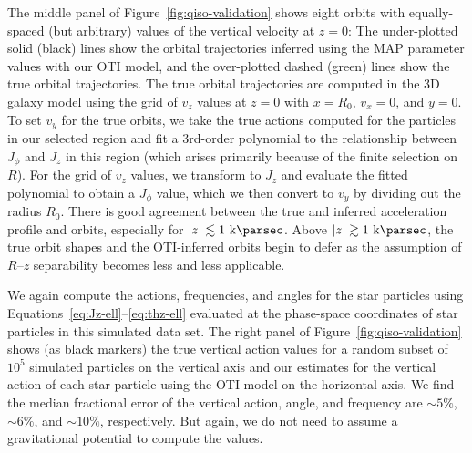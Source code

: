 The middle panel of Figure~\ref{fig:qiso-validation} shows eight orbits with
equally-spaced (but arbitrary) values of the vertical velocity at $z=0$: The
under-plotted solid (black) lines show the orbital trajectories inferred using the MAP
parameter values with our OTI model, and the over-plotted dashed (green) lines show the
true orbital trajectories.
The true orbital trajectories are computed in the 3D galaxy model using the grid of
$v_z$ values at $z=0$ with $x=R_0$, $v_x=0$, and $y=0$.
To set $v_y$ for the true orbits, we take the true actions computed for the particles in
our selected region and fit a 3rd-order polynomial to the relationship between $J_\phi$
and $J_z$ in this region (which arises primarily because of the finite selection on
$R$).
For the grid of $v_z$ values, we transform to $J_z$ and evaluate the fitted polynomial
to obtain a $J_\phi$ value, which we then convert to $v_y$ by dividing out the radius
$R_0$.
There is good agreement between the true and inferred acceleration profile and orbits,
especially for $|z| \lesssim 1~\kpc$.
Above $|z| \gtrsim 1~\kpc$, the true orbit shapes and the OTI-inferred orbits begin to
defer as the assumption of $R$--$z$ separability becomes less and less applicable.

We again compute the actions, frequencies, and angles for the star particles using
Equations~\ref{eq:Jz-ell}--\ref{eq:thz-ell} evaluated at the phase-space coordinates of
star particles in this simulated data set.
The right panel of Figure~\ref{fig:qiso-validation} shows (as black markers) the true
vertical action values for a random subset of $10^5$ simulated particles on the vertical
axis and our estimates for the vertical action of each star particle using the OTI
model on the horizontal axis.
We find the median fractional error of the vertical action, angle, and frequency are
$\sim 5\%$, $\sim 6\%$, and $\sim 10\%$, respectively.
But again, we do not need to assume a gravitational potential to compute the values.


